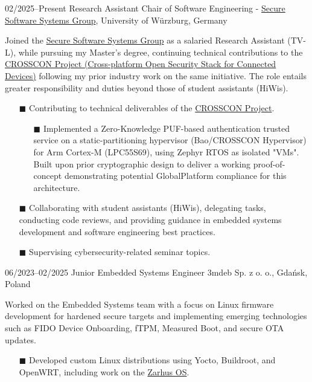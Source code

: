 \documentclass[9pt]{./src/packages/Developer_CV/developercv}
\begin{document}
\begin{entrylist}
    \raggedright %
    \entry
    {02/2025--Present}
    {Research Assistant}
    {Chair of Software Engineering - \href{https://se.informatik.uni-wuerzburg.de/en/secure-software-systems-group/}{Secure Software Systems Group}, University of Würzburg, Germany}
    {
        Joined the \href{https://se.informatik.uni-wuerzburg.de/en/secure-software-systems-group/}{Secure Software Systems Group} as a salaried Research Assistant (TV-L), while pursuing my Master’s degree, continuing technical contributions to the \href{https://crosscon.eu/}{CROSSCON Project (Cross-platform Open Security Stack for Connected Devices)} following my prior industry work on the same initiative. The role entails greater responsibility and duties beyond those of student assistants (HiWis).
    \begin{enumerate}
        \item[$\blacksquare$] Contributing to technical deliverables of the \href{https://crosscon.eu/}{CROSSCON Project}.
    \begin{enumerate}
    \item[$\blacksquare$] Implemented a Zero-Knowledge PUF-based authentication trusted service on a static-partitioning hypervisor (Bao/CROSSCON Hypervisor) for Arm Cortex-M (LPC55S69), using Zephyr RTOS as isolated "VMs". Built upon prior cryptographic design to deliver a working proof-of-concept demonstrating potential GlobalPlatform compliance for this architecture.
    \end{enumerate}
        \item[$\blacksquare$] Collaborating with student assistants (HiWis), delegating tasks, conducting code reviews, and providing guidance in embedded systems development and software engineering best practices.
        \item[$\blacksquare$] Supervising cybersecurity-related seminar topics.
    \end{enumerate}
    }
    \entry
    {06/2023--02/2025}
    {Junior Embedded Systems Engineer}
    {3mdeb Sp. z o. o., Gdańsk, Poland}
    {
    Worked on the Embedded Systems team with a focus on Linux firmware development for hardened secure targets and implementing emerging technologies such as FIDO Device Onboarding, fTPM, Measured Boot, and secure OTA updates.
    \begin{enumerate}
        \item[$\blacksquare$] Developed custom Linux distributions using Yocto, Buildroot, and OpenWRT, including work on the \href{https://docs.zarhus.com/}{Zarhus OS}.

\end{enumerate}}
\end{entrylist}
\end{document}

